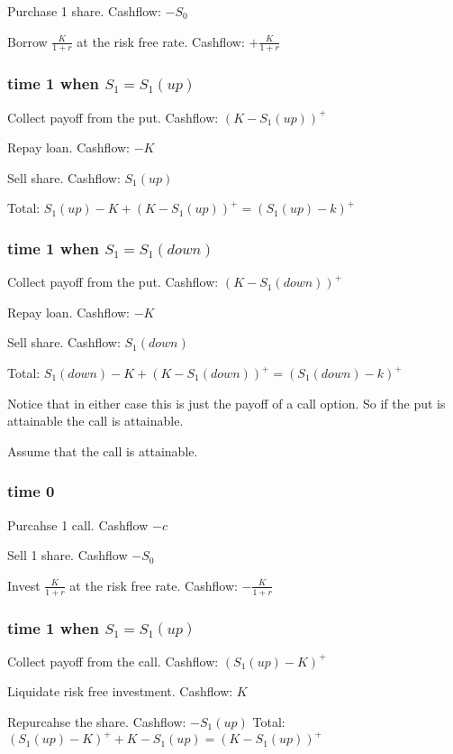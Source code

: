 \documentclass{unswmaths}
\begin{document}
Purchase 1 share. \hfill Cashflow: $-S_0$

Borrow $ \frac{K}{1+r} $ at the risk free rate. \hfill Cashflow: $+ \frac{K}{1+r}$

\subsubsection*{time 1 when $ S_1 = S_1(up) $}
Collect payoff from the put.    \hfill Cashflow: $ (K-S_1(up))^+ $

Repay loan.     \hfill Cashflow: $ - K $

Sell share.     \hfill Cashflow: $ S_1(up) $

\hfill Total: $ S_1(up) - K + (K - S_1(up))^+ = (S_1(up)-k)^+$

\subsubsection*{time 1 when $ S_1 = S_1(down) $}
Collect payoff from the put.    \hfill Cashflow: $ (K-S_1(down))^+ $

Repay loan.     \hfill Cashflow: $ - K $

Sell share.     \hfill Cashflow: $ S_1(down) $

\hfill Total: $ S_1(down) - K + (K - S_1(down))^+ = (S_1(down)-k)^+$

Notice that in either case this is just the payoff of a call option. So if the put
is attainable the call is attainable.


Assume that the call is attainable.
\subsubsection*{time 0}
Purcahse 1 call. \hfill Cashflow $ -c $

Sell 1 share.   \hfill Cashflow $ -S_0$

Invest $ \frac{K}{1+r} $ at the risk free rate. \hfill Cashflow: $ -\frac{K}{1+r} $

\subsubsection*{time 1 when $ S_1 = S_1(up) $}
Collect payoff from the call.    \hfill Cashflow: $ (S_1(up)-K)^+ $

Liquidate risk free investment. \hfill Cashflow: $ K $

Repurcahse the share.     \hfill Cashflow: $ -S_1(up) $
\hfill Total: $ (S_1(up)-K)^+ + K -S_1(up) = (K - S_1(up))^+ $
\end{document}
